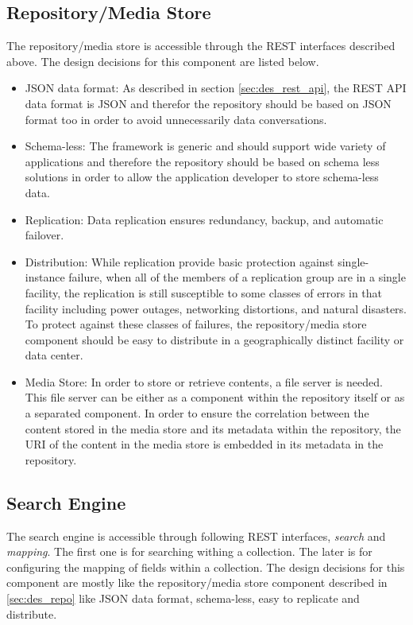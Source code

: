 \subsection{Repository/Media Store \label{sec:des_repo}}

The repository/media store is accessible through the \ac{REST} interfaces described above. The design decisions for this component are listed below.

\begin{itemize}
\item {JSON data format:} As described in section \ref{sec:des_rest_api}, the \ac{REST} \ac{API} data format is \ac{JSON} and therefor the repository should be based on \ac{JSON} format too in order to avoid unnecessarily data conversations.

\item {Schema-less:} The framework is generic and should support wide variety of applications and therefore the repository should be based on schema less solutions in order to allow the application developer to store schema-less data.

\item {Replication:} Data replication ensures redundancy, backup, and automatic failover.

\item {Distribution:} While replication provide basic protection against single-instance failure, when all of the members of a replication group are in a single facility, the replication is still susceptible to some classes of errors in that facility including power outages, networking distortions, and natural disasters. To protect against these classes of failures, the repository/media store component should be easy to distribute in a geographically distinct facility or data center.

\item {Media Store:} In order to store or retrieve contents, a file server is needed. This file server can be either as a component within the repository itself or as a separated component. In order to ensure the correlation between the content stored in the media store and its metadata within the repository, the URI of the content in the media store is embedded in its metadata in the repository.
\end{itemize}
 
\subsection{Search Engine\label{sec:des_se_en}}
The search engine is accessible through following \ac{REST} interfaces, \textit{search} and \textit{mapping}. The first one is for searching withing a collection. The later is for configuring the mapping of fields within a collection. The design decisions for this component are mostly like the repository/media store component described in \ref{sec:des_repo} like \ac{JSON} data format, schema-less, easy to replicate and distribute.%

